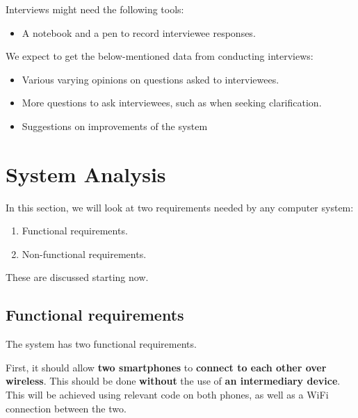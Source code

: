 \documentclass[12pt,svgnames,smaller]{article} %
\begin{document}
		Interviews might need the following tools:
		
		\begin{itemize}
			\item A notebook and a pen to record interviewee responses.
		\end{itemize}
		
		We expect to get the below-mentioned data from conducting interviews:
		
		\begin{itemize}
			\item Various varying opinions on questions asked to interviewees.
			\item More questions to ask interviewees, such as when seeking clarification.
			\item Suggestions on improvements of the system 
		\end{itemize}
		
		
	
	\clearpage
	
	
	\section{\textbf{System Analysis} } 
	
	In this section, we will look at two requirements needed by any computer system:
	
	\begin{enumerate}
		\item Functional requirements.
		\item Non-functional requirements.
	\end{enumerate}
	
	These are discussed starting now.
	
	\subsection{Functional requirements}
	
	The system has two functional requirements.
	
	First, it should allow \textbf{two smartphones} to \textbf{connect to each other over wireless}. This should be done \textbf{without} the use of \textbf{an intermediary device}. This will be achieved using relevant code on both phones, as well as a WiFi connection between the two.
	
\end{document}
